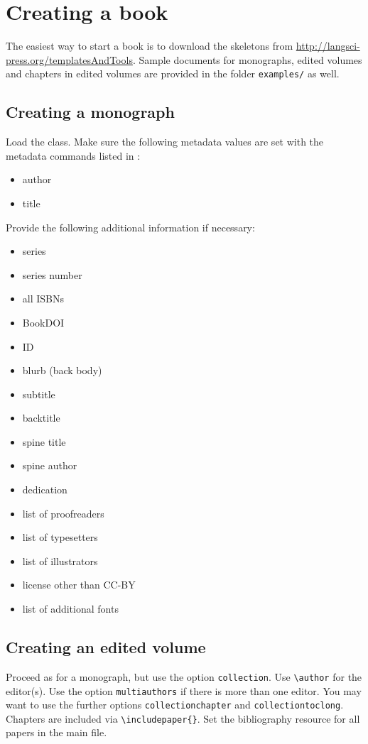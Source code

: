 \documentclass[%
output=guidelines,
guidelines]{langscibook}
\begin{document}
\chapter{Creating a book}
The easiest way to start a book is to download the skeletons from \url{http://langsci-press.org/templatesAndTools}. Sample documents for monographs, edited volumes and chapters in edited volumes are provided in the folder \texttt{examples/} as well.

\section{Creating a monograph}
Load the class. Make sure the following metadata values are set with the metadata commands listed in :

\begin{itemize}
 \item author
 \item title
\end{itemize}

Provide the following additional information if necessary:
\begin{itemize}
 \item series
 \item series number
 \item all ISBNs
 \item BookDOI
 \item ID
 \item blurb (back body)
 \item subtitle
 \item backtitle
 \item spine title
 \item spine author
 \item dedication
 \item list of proofreaders
 \item list of typesetters
 \item list of illustrators
 \item license other than CC-BY
 \item list of additional fonts
\end{itemize}


\section{Creating an edited volume}
Proceed as for a monograph, but use the option \texttt{collection}. Use \verb+\author+ for the editor(s). Use the option \texttt{multiauthors} if there is more than one editor. You may want to use the further options \texttt{collectionchapter} and \texttt{collectiontoclong}. Chapters are included via \verb+\includepaper{}+. Set the bibliography resource for all papers in the main file.
\end{document}
